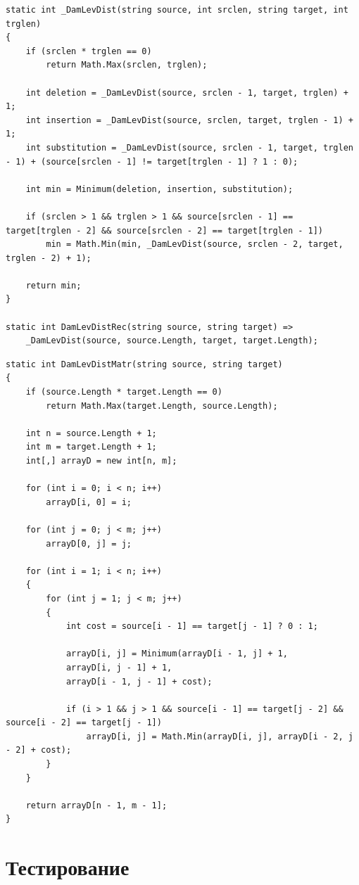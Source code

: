 \documentclass{report}
\begin{document}
\begin{lstlisting}[label=code4,caption=Функция для рекурсивного нахождения расстояния Дамерау-Левенштейна]
static int _DamLevDist(string source, int srclen, string target, int trglen)
{
	if (srclen * trglen == 0)
		return Math.Max(srclen, trglen);
	
	int deletion = _DamLevDist(source, srclen - 1, target, trglen) + 1;
	int insertion = _DamLevDist(source, srclen, target, trglen - 1) + 1;
	int substitution = _DamLevDist(source, srclen - 1, target, trglen - 1) + (source[srclen - 1] != target[trglen - 1] ? 1 : 0);
	
	int min = Minimum(deletion, insertion, substitution);
	
	if (srclen > 1 && trglen > 1 && source[srclen - 1] == target[trglen - 2] && source[srclen - 2] == target[trglen - 1])
		min = Math.Min(min, _DamLevDist(source, srclen - 2, target, trglen - 2) + 1);
	
	return min;
}

static int DamLevDistRec(string source, string target) =>
	_DamLevDist(source, source.Length, target, target.Length);

\end{lstlisting}
\newpage
\begin{lstlisting}[label=code5,caption=Функция для нерекурсивного нахождения расстояния Дамерау-Левенштейна с кэшем в виде матрицы]
static int DamLevDistMatr(string source, string target)
{
	if (source.Length * target.Length == 0)
		return Math.Max(target.Length, source.Length);
	
	int n = source.Length + 1;
	int m = target.Length + 1;
	int[,] arrayD = new int[n, m];
	
	for (int i = 0; i < n; i++)
		arrayD[i, 0] = i;
	
	for (int j = 0; j < m; j++)
		arrayD[0, j] = j;
	
	for (int i = 1; i < n; i++)
	{
		for (int j = 1; j < m; j++)
		{
			int cost = source[i - 1] == target[j - 1] ? 0 : 1;
			
			arrayD[i, j] = Minimum(arrayD[i - 1, j] + 1,
			arrayD[i, j - 1] + 1,
			arrayD[i - 1, j - 1] + cost);
			
			if (i > 1 && j > 1 && source[i - 1] == target[j - 2] && source[i - 2] == target[j - 1])
				arrayD[i, j] = Math.Min(arrayD[i, j], arrayD[i - 2, j - 2] + cost);
		}
	}
	
	return arrayD[n - 1, m - 1];
}
\end{lstlisting}

\section{Тестирование}
\end{document}
